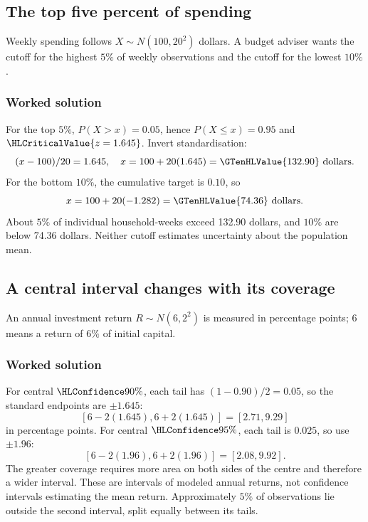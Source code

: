 \subsection{The top five percent of spending}\label{prob:sec:general-worked0}
Weekly spending follows $X\sim N(100,20^2)$ dollars. A budget adviser wants the cutoff for the highest $5\%$ of weekly observations and the cutoff for the lowest $10\%$.
\subsubsection*{Worked solution}\label{sol:sec:general-worked0}
For the top $5\%$, $P(X>x)=0.05$, hence $P(X\le x)=0.95$ and $\HLCriticalValue{z=1.645}$. Invert standardisation:
\[
(x-100)/20=1.645,\quad x=100+20(1.645)=\GTenHLValue{132.90}\text{ dollars}.
\]
For the bottom $10\%$, the cumulative target is $0.10$, so
\[
x=100+20(-1.282)=\GTenHLValue{74.36}\text{ dollars}.
\]
About $5\%$ of individual household-weeks exceed 132.90 dollars, and $10\%$ are below 74.36 dollars. Neither cutoff estimates uncertainty about the population mean.


\subsection{A central interval changes with its coverage}\label{prob:sec:general-worked1}
An annual investment return $R\sim N(6,2^2)$ is measured in percentage points; 6 means a return of $6\%$ of initial capital.
\subsubsection*{Worked solution}\label{sol:sec:general-worked1}
For central $\HLConfidence{90\%}$, each tail has $(1-0.90)/2=0.05$, so the standard endpoints are $\pm1.645$:
\[
[6-2(1.645),6+2(1.645)]=[2.71,9.29]
\]
in percentage points. For central $\HLConfidence{95\%}$, each tail is $0.025$, so use $\pm1.96$:
\[
[6-2(1.96),6+2(1.96)]=[2.08,9.92].
\]
The greater coverage requires more area on both sides of the centre and therefore a wider interval. These are intervals of modeled annual returns, not confidence intervals estimating the mean return. Approximately $5\%$ of observations lie outside the second interval, split equally between its tails.


